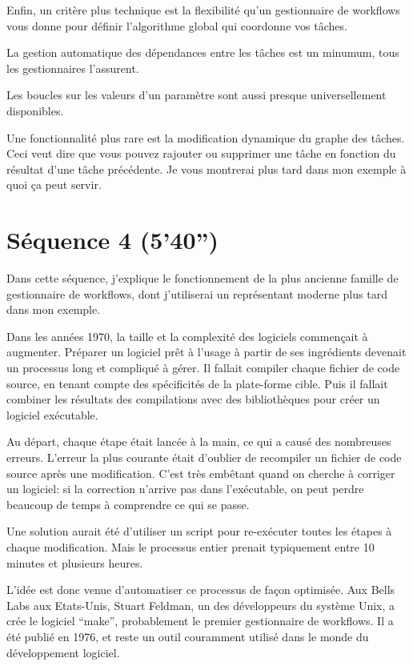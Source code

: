 \documentclass[12pt]{article}
\begin{document}
\newpage

Enfin, un critère plus technique est la flexibilité qu'un gestionnaire
de workflows vous donne pour définir l'algorithme global qui coordonne
vos tâches.

La gestion automatique des dépendances entre les tâches est un
minumum, tous les gestionnaires l'assurent.

Les boucles sur les valeurs d'un paramètre sont aussi presque
universellement disponibles.

Une fonctionnalité plus rare est la modification dynamique du graphe
des tâches. Ceci veut dire que vous pouvez rajouter ou supprimer une
tâche en fonction du résultat d'une tâche précédente. Je vous
montrerai plus tard dans mon exemple à quoi ça peut servir.

\newpage
\section*{Séquence 4 (5'40'')}

Dans cette séquence, j'explique le fonctionnement de la plus ancienne
famille de gestionnaire de workflows, dont j'utiliserai un
représentant moderne plus tard dans mon exemple.

\newpage

Dans les années 1970, la taille et la complexité des logiciels
commençait à augmenter. Préparer un logiciel prêt à l'usage à partir
de ses ingrédients devenait un processus long et compliqué à gérer.
Il fallait compiler chaque fichier de code source, en tenant
compte des spécificités de la plate-forme cible. Puis il fallait
combiner les résultats des compilations avec des bibliothèques
pour créer un logiciel exécutable.

Au départ, chaque étape était lancée à la main, ce qui a causé des
nombreuses erreurs. L'erreur la plus courante était d'oublier de
recompiler un fichier de code source après une modification. C'est
très embêtant quand on cherche à corriger un logiciel: si la
correction n'arrive pas dans l'exécutable, on peut perdre beaucoup de
temps à comprendre ce qui se passe.

Une solution aurait été d'utiliser un script pour re-exécuter toutes
les étapes à chaque modification. Mais le processus entier prenait
typiquement entre 10 minutes et plusieurs heures.

L'idée est donc venue d'automatiser ce processus de façon
optimisée. Aux Bells Labs aux Etats-Unis, Stuart Feldman, un des
développeurs du système Unix, a crée le logiciel ``make'',
probablement le premier gestionnaire de workflows. Il a été publié en
1976, et reste un outil couramment utilisé dans le monde du
développement logiciel.
\end{document}
